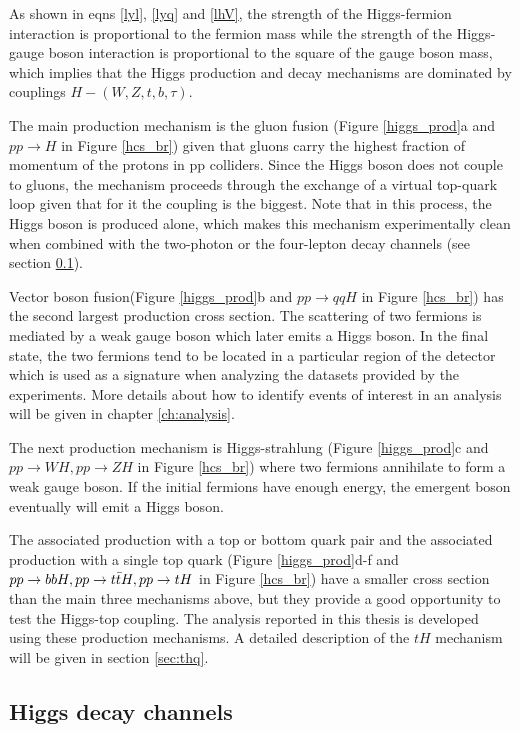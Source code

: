 \noindent As shown in eqns \ref{lyl}, \ref{lyq} and \ref{lhV}, the strength of the Higgs-fermion interaction is proportional to the fermion mass while the strength of the Higgs-gauge boson interaction is proportional to the square of the gauge boson mass, which implies that the Higgs production and decay mechanisms are dominated by couplings $H-(W,Z,t,b,\tau)$. 

\noindent The main production mechanism is the gluon fusion (Figure \ref{higgs_prod}a and $pp\to H$ in Figure \ref{hcs_br}) given that gluons carry the highest fraction of momentum of the protons in pp colliders. Since the Higgs boson does not couple to gluons, the mechanism proceeds through the exchange of a virtual top-quark loop given that for it the coupling is the biggest. Note that in this process, the Higgs boson is produced alone, which makes this mechanism experimentally clean when combined with the two-photon or the four-lepton decay channels (see section \ref{sec:decays}).

\noindent Vector boson fusion(Figure \ref{higgs_prod}b and $pp\to qqH$ in Figure \ref{hcs_br}) has the second largest production cross section. The scattering of two fermions is mediated by a weak gauge boson which later emits a Higgs boson. In the final state, the two fermions tend to be located in a particular region of the detector which is used as a signature when analyzing the datasets provided by the experiments. More details about how to identify events of interest in an analysis will be given in chapter \ref{ch:analysis}. 

\noindent The next production mechanism is Higgs-strahlung (Figure \ref{higgs_prod}c and $pp\to WH, pp\to ZH$ in Figure \ref{hcs_br}) where two fermions annihilate to form a weak gauge boson. If the initial fermions have enough energy, the emergent boson eventually will emit a Higgs boson.

\noindent The associated production with a top or bottom quark pair and the associated production with a single top quark (Figure \ref{higgs_prod}d-f and $pp\to bbH, pp\to t\bar{t}H, pp\to tH$ in Figure \ref{hcs_br}) have a smaller cross section than the main three mechanisms above, but they provide a good opportunity to test the Higgs-top coupling. The analysis reported in this thesis is developed using these production mechanisms. A detailed description of the $tH$ mechanism will be given in section \ref{sec:thq}.  

\subsection{Higgs decay channels}\label{sec:decays}

